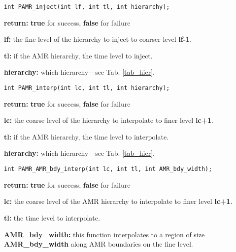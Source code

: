 \documentclass[aps,amssymb,unsortedaddress,nofootinbib]{revtex4}
\def\lsep{\itemsep 0.05in}
\begin{document}

\begin{verbatim}
int PAMR_inject(int lf, int tl, int hierarchy);
\end{verbatim}
\begin{list}{}{\lsep}
\item {\bf return:} {\bf true} for success, {\bf false} for failure
\item {\bf lf:} the fine level of the hierarchy to inject to coarser level {\bf lf-1}.
\item {\bf tl:} if the AMR hierarchy, the time level to inject.
\item {\bf hierarchy:} which hierarchy---see Tab. \ref{tab_hier}.
\end{list}


\begin{verbatim}
int PAMR_interp(int lc, int tl, int hierarchy);
\end{verbatim}
\begin{list}{}{\lsep}
\item {\bf return:}  {\bf true} for success, {\bf false} for failure
\item {\bf lc:} the coarse level of the hierarchy to interpolate to finer level {\bf lc+1}.
\item {\bf tl:} if the AMR hierarchy, the time level to interpolate.
\item {\bf hierarchy:} which hierarchy---see Tab. \ref{tab_hier}.
\end{list}


\begin{verbatim}
int PAMR_AMR_bdy_interp(int lc, int tl, int AMR_bdy_width);
\end{verbatim}
\begin{list}{}{\lsep}
\item {\bf return:} {\bf true} for success, {\bf false} for failure
\item {\bf lc:} the coarse level of the AMR hierarchy to interpolate to finer level {\bf lc+1}.
\item {\bf tl:} the time level to interpolate.
\item {\bf AMR\_bdy\_width:} this function interpolates to a region of size {\bf AMR\_bdy\_width}
                             along AMR boundaries on the fine level.
\end{list}
\end{document}
